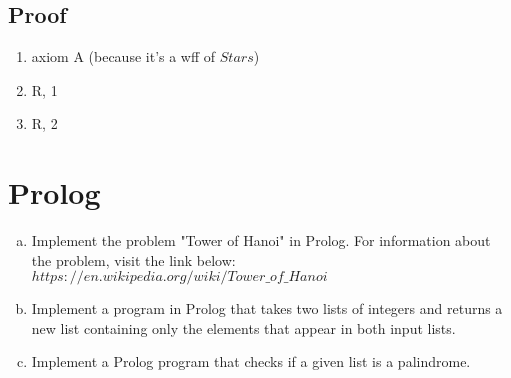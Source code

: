 \documentclass[11pt]{article}
\begin{document}
\subsection{Proof}
\begin{enumerate}
    \item \makebox[7em][l]{${\star}{\diamond}{\star}{\star}{\circ}{\star}{\star}{\star}{\star}{\star}$} axiom A (because it's a wff of $Stars$)
    \item \makebox[7em][l]{${\star}{\diamond}{\star}{\star}{\star}{\circ}{\star}{\star}{\star}{\star}{\star}{\star}$} R, 1
    \item \makebox[7em][l]{${\star}{\diamond}{\star}{\star}{\star}{\star}{\circ}{\star}{\star}{\star}{\star}{\star}{\star}{\star}$} R, 2
\end{enumerate}

\section{Prolog}

\begin{enumerate}[(a)]

    \item Implement the problem "Tower of Hanoi" in Prolog. For information about the problem, visit the link below:
          ${https://en.wikipedia.org/wiki/Tower\_of\_Hanoi}$

    \item Implement a program in Prolog that takes two lists of integers and returns a new list containing only the elements that appear in both input lists.

    \item Implement a Prolog program that checks if a given list is a palindrome.

\end{enumerate}
\end{document}
